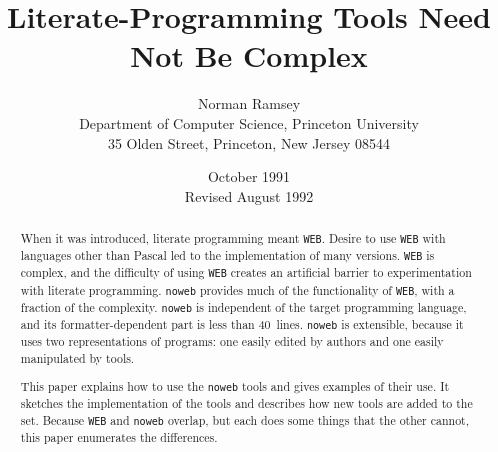 \title{Literate-Programming Tools Need Not Be Complex}
\author{Norman Ramsey\\Department of Computer Science, Princeton University\\
35 Olden Street, Princeton, New Jersey 08544}
\newif\iftr
\trtrue
\iftr{}
\date{October 1991\\Revised August 1992}
\else
\date{August 1992}
\fi
\setcounter{secnumdepth}{0}
\makeatletter
\def\refno#1{\nocite{#1}\@ifundefined
       {b@#1}{{\bf ?}\@warning
       {Reference number `#1' on page \thepage \space undefined}}%
{\hbox{\csname b@#1\endcsname}}}
\makeatother

\def\remark#1{\marginpar{\raggedright\hbadness=10000\footnotesize\it #1}}



\maketitle

\begin{abstract}
When it was introduced, literate programming meant {\tt WEB}.
Desire to use {\tt WEB} with languages other than Pascal led to the
implementation of many versions.
{\tt WEB} is complex, and the difficulty of using {\tt WEB} creates
an artificial barrier to
experimentation with literate programming.
 {\tt noweb} provides much of the functionality of
{\tt WEB}, with a fraction of the complexity.
{\tt noweb} is independent of the target programming language, and its
formatter-dependent part is less than 40~lines.
{\tt noweb} is extensible, because it uses two
representations of programs: one easily edited by authors and one
easily manipulated by tools.

This paper explains how to use the {\tt noweb} tools and gives
examples of their use.
It sketches the implementation of the tools and describes how new
tools are added to the set.
Because 
{\tt WEB} and {\tt noweb} overlap, but each does some things that the
other cannot,
this paper enumerates the differences.
\end{abstract}

\iftr\else
\begin{center}\small
{\bf Key words:}
literate~programming, readability, programming~environments
\end{center}
\fi


